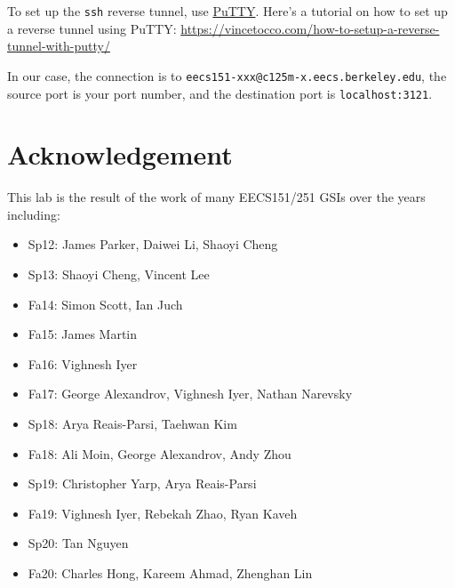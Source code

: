 \documentclass[11pt]{article}
\begin{document}
To set up the \texttt{ssh} reverse tunnel, use \href{https://www.putty.org/}{PuTTY}.
Here's a tutorial on how to set up a reverse tunnel using PuTTY:
\url{https://vincetocco.com/how-to-setup-a-reverse-tunnel-with-putty/}

In our case, the connection is to \texttt{eecs151-xxx@c125m-x.eecs.berkeley.edu}, the source port is your port number, and the destination port is \texttt{localhost:3121}.

\section*{Acknowledgement}
This lab is the result of the work of many EECS151/251 GSIs over the years including:
\begin{itemize}
\item Sp12: James Parker, Daiwei Li, Shaoyi Cheng
\item Sp13: Shaoyi Cheng, Vincent Lee
\item Fa14: Simon Scott, Ian Juch
\item Fa15: James Martin
\item Fa16: Vighnesh Iyer
\item Fa17: George Alexandrov, Vighnesh Iyer, Nathan Narevsky
\item Sp18: Arya Reais-Parsi, Taehwan Kim
\item Fa18: Ali Moin, George Alexandrov, Andy Zhou
\item Sp19: Christopher Yarp, Arya Reais-Parsi
\item Fa19: Vighnesh Iyer, Rebekah Zhao, Ryan Kaveh
\item Sp20: Tan Nguyen
\item Fa20: Charles Hong, Kareem Ahmad, Zhenghan Lin
\end{itemize}
\end{document}
